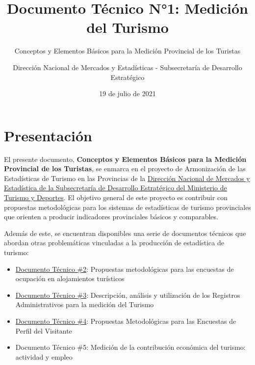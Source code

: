 \documentclass[
  openany]{book}
\title{Documento Técnico N°1: Medición del Turismo}
\subtitle{Conceptos y Elementos Básicos para la Medición Provincial de los Turistas}
\author{Dirección Nacional de Mercados y Estadísticas - Subsecretaría de Desarrollo Estratégico}
\date{19 de julio de 2021}
\let\oldmaketitle\maketitle
\begin{document}
\maketitle


\newpage

\let\maketitle\oldmaketitle
\maketitle

{
\setcounter{tocdepth}{1}
\tableofcontents
}
\hypertarget{presentaciuxf3n}{%
\chapter*{Presentación}\label{presentaciuxf3n}}

El presente documento, \textbf{Conceptos y Elementos Básicos para la Medición Provincial de los Turistas}, se enmarca en el proyecto de Armonización de las Estadísticas de Turismo en las Provincias de la \href{http://datos.yvera.gob.ar/}{Dirección Nacional de Mercados y Estadística de la Subsecretaría de Desarrollo Estratégico del Ministerio de Turismo y Deportes}. El objetivo general de este proyecto es contribuir con propuestas metodológicas para los sistemas de estadísticas de turismo provinciales que orienten a producir indicadores provinciales básicos y comparables.

Además de este, se encuentran disponibles una serie de documentos técnicos que abordan otras problemáticas vinculadas a la producción de estadística de turismo:

\begin{itemize}
\item
  \href{https://dnme-minturdep.github.io/DT2_encuestas/}{Documento Técnico \#2}: Propuestas metodológicas para las encuestas de ocupación en alojamientos turísticos
\item
  \href{https://dnme-minturdep.github.io/DT3_registros_adminsitrativos/}{Documento Técnico \#3}: Descripción, análisis y utilización de los Registros Administrativos para la medición del Turismo
\item
  \href{https://dnme-minturdep.github.io/DT4_perfiles/}{Documento Técnico \#4}: Propuestas Metodológicas para las Encuestas de Perfil del Visitante
\item
  Documento Técnico \#5: Medición de la contribución económica del turismo: actividad y empleo
\end{itemize}
\end{document}
